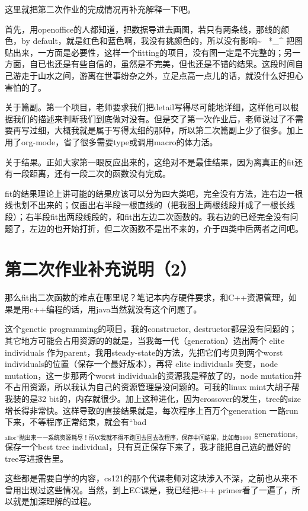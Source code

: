 \documentclass[12pt]{book}
\begin{document}
这里就把第二次作业的完成情况再补充解释一下吧。

首先，用openoffice的人都知道，把数据导进去画图，若只有两条线，那线的颜色，by default，就是红色和蓝色啊，我没有挑颜色的，所以没有影响\textasciitilde{}~ *\_\^{} 把图贴出来，一方面是必要性，这样一个fitting的项目，没有图一定是不完整的；另一方面，自已也还是有些自信的，虽然是不完美，但也还是不错的结果。这段时间自己游走于山水之间，游离在世事纷杂之外，立足点高一点儿的话，就没什么好担心害怕的了。

关于篇副。第一个项目，老师要求我们把detail写得尽可能地详细，这样他可以根据我们的描述来判断我们到底做对没有。但是交了第一次作业后，老师说过了不需要再写过细，大概我就是属于写得太细的那种，所以第二次篇副上少了很多。加上用了org-mode，省了很多需要type或调用macro的体力活。

关于结果。正如大家第一眼反应出来的，这绝对不是最佳结果，因为离真正的fit还有一段距离，还有一段二次的函数没有完成。

fit的结果理论上讲可能的结果应该可以分为四大类吧，完全没有方法，连右边一根线也划不出来的；仅画出右半段一根直线的（把我图上两根线段并成了一根长线段）；右半段fit出两段线段的，和fit出左边二次函数的。我右边的已经完全没有问题了，左边的也开始打折，但二次函数不是出不来的，介于四类中后两者之间吧。

\section{第二次作业补充说明（2）}
\label{sec-27-4}

那么fit出二次函数的难点在哪里呢？笔记本内存硬件要求，和C++资源管理，如果是用c++编程的话，用java当然就没有这个问题了。

这个genetic programming的项目，我的constructor, destructor都是没有问题的；其它地方可能会占用资源的的就是，当我每一代（generation）选出两个 elite individuals 作为parent，我用steady-state的方法，先把它们考贝到两个worst individuals的位置（保存一个最好版本），再将 elite individuals 突变，node mutation，这一步那两个worst individuals的资源我是释放了的，node mutation并不占用资源，所以我认为自己的资源管理是没问题的。可我的linux mint大胡子帮我装的是32 bit的，内存就很少。加上这种进化，因为crossover的发生，tree的size增长得非常快。这样导致的直接结果就是，每次程序上百万个generation 一路run下来，不等程序正常结束，就会有“bad$_{\text{alloc”抛出来一一系统资源耗尽！所以我就不得不跑回去回去改程序，保存中间结果，比如每1000}}$ generations, 保存一个best tree individual，只有真正保存下来了，我才能把自己选的最好的tree写进报告里。

这些都是需要自学的内容，cs121的那个代课老师对这块涉入不深，之前也从来不曾用出现过这些情况。当然，到上EC课是，我已经把c++ primer看了一遍了，所以就是加深理解的过程。
\end{document}
